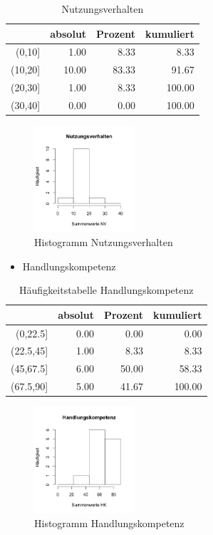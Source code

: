 \documentclass[12pt, bibliography=totoc]{scrartcl}
\begin{document}
\begin{table}[H]
\centering
\caption{Nutzungsverhalten}
\begin{tabular}{rrrr}
  \hline
 & absolut & Prozent & kumuliert \\
  \hline
(0,10] & 1.00 & 8.33 & 8.33 \\
  (10,20] & 10.00 & 83.33 & 91.67 \\
  (20,30] & 1.00 & 8.33 & 100.00 \\
  (30,40] & 0.00 & 0.00 & 100.00 \\
   \hline
\end{tabular}
\end{table}

\begin{figure}[H]
\centering
\caption{Histogramm Nutzungsverhalten}
\includegraphics[width=0.33\textwidth]{Anhang/NVHist.png}
\end{figure}

\begin{itemize}
\tightlist
\item
  Handlungskompetenz
\end{itemize}

\begin{table}[H]
\centering
\caption{Häufigkeitstabelle Handlungskompetenz}
\begin{tabular}{rrrr}
  \hline
 & absolut & Prozent & kumuliert \\
  \hline
(0,22.5] & 0.00 & 0.00 & 0.00 \\
  (22.5,45] & 1.00 & 8.33 & 8.33 \\
  (45,67.5] & 6.00 & 50.00 & 58.33 \\
  (67.5,90] & 5.00 & 41.67 & 100.00 \\
   \hline
\end{tabular}
\end{table}

\begin{figure}[H]
\centering
\caption{Histogramm Handlungskompetenz}
\includegraphics[width=0.33\textwidth]{Anhang/HKHist.png}
\end{figure}
\end{document}
